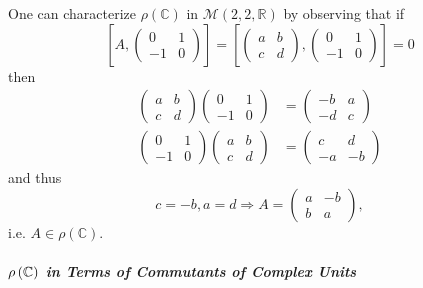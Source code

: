 \documentclass[aps,preprint]{revtex4}
\begin{document}
One can characterize $\rho \left( \mathbb{C}\right) $ in $\mathcal{M}\left(
2,2,\mathbb{R}\right) $ by observing that if 
\begin{equation}
\left[ A,\left( 
\begin{array}{cc}
0 & 1 \\ 
-1 & 0%
\end{array}%
\right) \right] =\left[ \left( 
\begin{array}{cc}
a & b \\ 
c & d%
\end{array}%
\right) ,\left( 
\begin{array}{cc}
0 & 1 \\ 
-1 & 0%
\end{array}%
\right) \right] =0
\end{equation}%
then 
\begin{align}
\left( 
\begin{array}{cc}
a & b \\ 
c & d%
\end{array}%
\right) \left( 
\begin{array}{cc}
0 & 1 \\ 
-1 & 0%
\end{array}%
\right) & =\left( 
\begin{array}{cc}
-b & a \\ 
-d & c%
\end{array}%
\right) \\
\left( 
\begin{array}{cc}
0 & 1 \\ 
-1 & 0%
\end{array}%
\right) \left( 
\begin{array}{cc}
a & b \\ 
c & d%
\end{array}%
\right) & =\left( 
\begin{array}{cc}
c & d \\ 
-a & -b%
\end{array}%
\right)
\end{align}%
and thus 
\begin{equation}
c=-b,a=d\Rightarrow A=\left( 
\begin{array}{cc}
a & -b \\ 
b & a%
\end{array}%
\right) ,
\end{equation}%
i.e. $A\in \rho \left( \mathbb{C}\right) $.

\subparagraph{ $\protect\rho \left( \mathbb{C}\right) $ in Terms of
Commutants of Complex Units \label{Commutants of Complex Units}}
\end{document}
